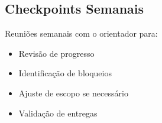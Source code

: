 \subsection{Checkpoints Semanais}

Reuniões semanais com o orientador para:
\begin{itemize}
    \item Revisão de progresso
    \item Identificação de bloqueios
    \item Ajuste de escopo se necessário
    \item Validação de entregas
\end{itemize}

